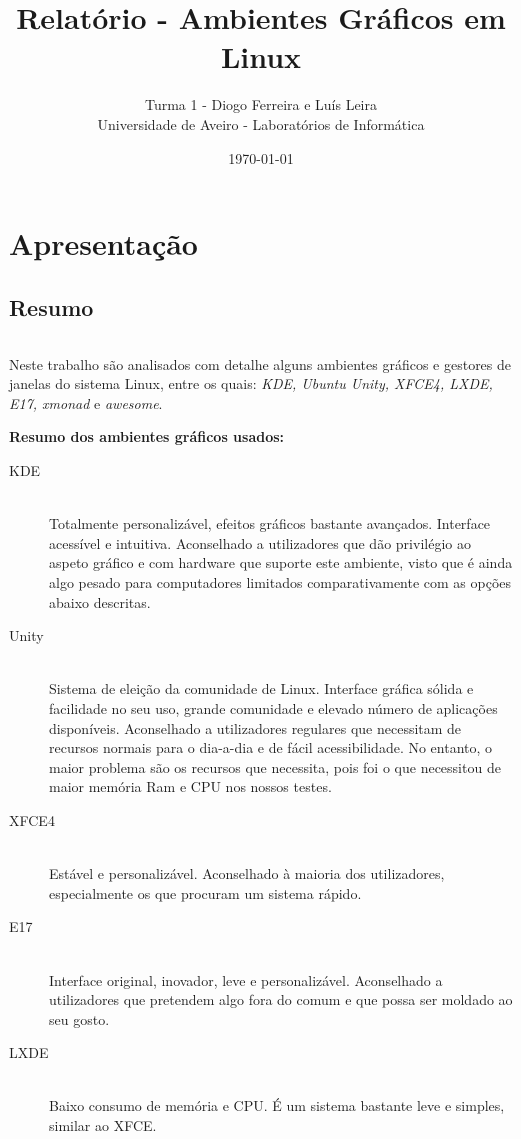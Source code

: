 \documentclass[11pt,openright,twoside]{report}
\title{\textbf{Relatório - Ambientes Gráficos em Linux}}
\author{Turma 1 - Diogo Ferreira e Luís Leira\\\vspace{3cm}
Universidade de Aveiro - Laboratórios de Informática}
\date{\today}
\begin{document}
\maketitle
\tableofcontents

\part{Apresentação}


\chapter{Resumo}
\paragraph{  }Neste trabalho são analisados com detalhe alguns ambientes gráficos e gestores de janelas do sistema Linux, entre os quais: \textit{KDE, Ubuntu Unity, XFCE4, LXDE, E17, xmonad} e \textit{awesome}.

  
 \textbf{ Resumo dos ambientes gráficos usados:}

  \begin{description}


  \item[KDE] \hfill \\
  Totalmente personalizável, efeitos gráficos bastante avançados. Interface acessível e intuitiva. Aconselhado a utilizadores que dão privilégio ao aspeto gráfico e com hardware que suporte este ambiente, visto que é ainda algo pesado para computadores limitados comparativamente com as opções abaixo descritas.
  
  \item[Unity] \hfill \\
  Sistema de eleição da comunidade de Linux. Interface gráfica sólida e facilidade no seu uso, grande comunidade e elevado número de aplicações disponíveis. Aconselhado a utilizadores regulares que necessitam de recursos normais para o dia-a-dia e de fácil acessibilidade. No entanto, o maior problema são os recursos que necessita, pois foi o que necessitou de maior memória Ram e CPU nos nossos testes.
  
 \item[XFCE4] \hfill \\
  Estável e personalizável. Aconselhado à maioria dos utilizadores, especialmente os que procuram um sistema rápido.
  
  \item[E17] \hfill \\
  Interface original, inovador, leve e personalizável. Aconselhado a utilizadores que pretendem algo fora do comum e que possa ser moldado ao seu gosto.
  
  \item[LXDE] \hfill \\
   Baixo consumo de memória e CPU. É um sistema bastante leve e simples, similar ao XFCE.
  
    \end{description}
  
\end{document}
